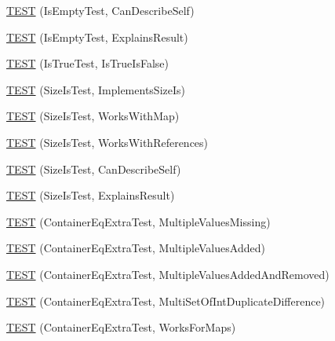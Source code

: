 \begin{DoxyCompactItemize}
\item 
\mbox{\hyperlink{namespacetesting_1_1gmock__matchers__test_adcf3743190f973f2773296d0772e8950}{T\+E\+ST}} (Is\+Empty\+Test, Can\+Describe\+Self)
\item 
\mbox{\hyperlink{namespacetesting_1_1gmock__matchers__test_a1c168c284000d05d63bf5e9df10d1b7c}{T\+E\+ST}} (Is\+Empty\+Test, Explains\+Result)
\item 
\mbox{\hyperlink{namespacetesting_1_1gmock__matchers__test_a1cd170a421c94a8edf104b72ee1f396d}{T\+E\+ST}} (Is\+True\+Test, Is\+True\+Is\+False)
\item 
\mbox{\hyperlink{namespacetesting_1_1gmock__matchers__test_abe619d5d1910e1f2e8b169622d1d8592}{T\+E\+ST}} (Size\+Is\+Test, Implements\+Size\+Is)
\item 
\mbox{\hyperlink{namespacetesting_1_1gmock__matchers__test_aea77169d6c56b88b5c99273d5a2bc0f2}{T\+E\+ST}} (Size\+Is\+Test, Works\+With\+Map)
\item 
\mbox{\hyperlink{namespacetesting_1_1gmock__matchers__test_a53bcd375786f69d889a8e8891ff8e0b0}{T\+E\+ST}} (Size\+Is\+Test, Works\+With\+References)
\item 
\mbox{\hyperlink{namespacetesting_1_1gmock__matchers__test_adc9720306de1626aa7e523637ca64dfa}{T\+E\+ST}} (Size\+Is\+Test, Can\+Describe\+Self)
\item 
\mbox{\hyperlink{namespacetesting_1_1gmock__matchers__test_a6c218845fd345302c490ef53f0d36995}{T\+E\+ST}} (Size\+Is\+Test, Explains\+Result)
\item 
\mbox{\hyperlink{namespacetesting_1_1gmock__matchers__test_ab84ac6cfde20f21ed69d5d7aa882ea1b}{T\+E\+ST}} (Container\+Eq\+Extra\+Test, Multiple\+Values\+Missing)
\item 
\mbox{\hyperlink{namespacetesting_1_1gmock__matchers__test_acc28beb0f3d3fbd8923bad7eb08ce6a6}{T\+E\+ST}} (Container\+Eq\+Extra\+Test, Multiple\+Values\+Added)
\item 
\mbox{\hyperlink{namespacetesting_1_1gmock__matchers__test_acb0d845f828c2d5a551e4db0611f2853}{T\+E\+ST}} (Container\+Eq\+Extra\+Test, Multiple\+Values\+Added\+And\+Removed)
\item 
\mbox{\hyperlink{namespacetesting_1_1gmock__matchers__test_a6bce9564bb713ffb690b776e35d2e6cf}{T\+E\+ST}} (Container\+Eq\+Extra\+Test, Multi\+Set\+Of\+Int\+Duplicate\+Difference)
\item 
\mbox{\hyperlink{namespacetesting_1_1gmock__matchers__test_ab7bcbeeeb23094cff6f2882304c05134}{T\+E\+ST}} (Container\+Eq\+Extra\+Test, Works\+For\+Maps)
\item 

\end{DoxyCompactItemize}
